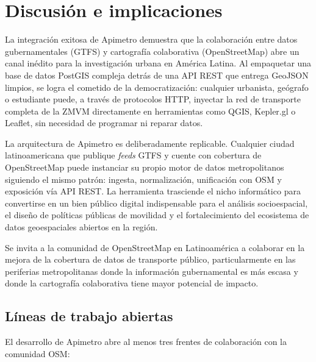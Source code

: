 
\section{Discusión e implicaciones}

La integración exitosa de Apimetro demuestra que la colaboración entre datos
gubernamentales (GTFS) y cartografía colaborativa (OpenStreetMap) abre un canal
inédito para la investigación urbana en América Latina.  Al empaquetar una base de
datos PostGIS compleja detrás de una API REST que entrega GeoJSON limpios, se logra
el cometido de la democratización: cualquier urbanista, geógrafo o estudiante puede,
a través de protocolos HTTP, inyectar la red de transporte completa de la ZMVM
directamente en herramientas como QGIS, Kepler.gl o Leaflet, sin necesidad de
programar ni reparar datos.

La arquitectura de Apimetro es deliberadamente replicable.  Cualquier ciudad
latinoamericana que publique \textit{feeds} GTFS y cuente con cobertura de
OpenStreetMap puede instanciar su propio motor de datos metropolitanos siguiendo
el mismo patrón: ingesta, normalización, unificación con OSM y exposición vía API
REST.  La herramienta trasciende el nicho informático para convertirse en un bien
público digital indispensable para el análisis socioespacial, el diseño de políticas
públicas de movilidad y el fortalecimiento del ecosistema de datos geoespaciales
abiertos en la región.

Se invita a la comunidad de OpenStreetMap en Latinoamérica a colaborar en la
mejora de la cobertura de datos de transporte público, particularmente en las
periferias metropolitanas donde la información gubernamental es más escasa y donde
la cartografía colaborativa tiene mayor potencial de impacto.

\subsection{Líneas de trabajo abiertas}

El desarrollo de Apimetro abre al menos tres frentes de colaboración con la
comunidad OSM:

